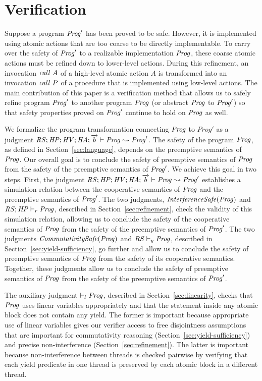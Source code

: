 \section{Verification}
\label{sec:verification}

Suppose a program $\mathit{Prog}'$ has been proved to be safe.
However, it is implemented using atomic actions that are too coarse to be directly implementable.  
To carry over the safety of $\mathit{Prog}'$ to a realizable implementation $\mathit{Prog}$, 
these coarse atomic actions must be refined down to lower-level actions.
During this refinement, an invocation $\mathit{call}\ A$ of a high-level atomic action $A$ is transformed into an 
invocation $\mathit{call}\ P$ of a procedure that is implemented using low-level actions.
The main contribution of this paper is a verification method that allows us to safely refine
program $\mathit{Prog}'$ to another program $\mathit{Prog}$ (or abstract $\mathit{Prog}$ to $\mathit{Prog}'$) so that 
safety properties proved on $\mathit{Prog}'$ continue to hold on $\mathit{Prog}$ as well.

We formalize the program transformation connecting $\mathit{Prog}$ to $Prog'$ as a judgment
$\mathit{RS};\mathit{HP};\mathit{HV};\mathit{HA};\overrightarrow{b} \vdash \mathit{Prog} \leadsto \mathit{Prog}'$.
The safety of the program $\mathit{Prog}$, as defined in Section~\ref{sec:language}, depends on 
the preemptive semantics of $\mathit{Prog}$.
Our overall goal is to conclude the safety of preemptive semantics of $\mathit{Prog}$
from the safety of the preemptive semantics of $\mathit{Prog}'$.
We achieve this goal in two steps.
First, the judgment $\mathit{RS};\mathit{HP};\mathit{HV};\mathit{HA};\overrightarrow{b} \vdash \mathit{Prog} \leadsto \mathit{Prog}'$
establishes a simulation relation between 
the cooperative semantics of $\mathit{Prog}$ and the preemptive semantics of $\mathit{Prog}'$.
The two judgments, $\mathit{InterferenceSafe}(\mathit{Prog})$ and $\mathit{RS};\mathit{HP} \vdash_r \mathit{Prog}$,
described in Section~\ref{sec:refinement}, check the validity of this simulation relation,
allowing us to conclude the safety of the cooperative semantics of $\mathit{Prog}$ from 
the safety of the preemptive semantics of $\mathit{Prog}'$.
The two judgments $\mathit{CommutativitySafe}(\mathit{Prog})$ and $\mathit{RS} \vdash_y \mathit{Prog}$,
described in Section~\ref{sec:yield-sufficiency}, go further 
and allow us to conclude the safety of preemptive semantics of $\mathit{Prog}$ from the 
safety of its cooperative semantics.
Together, these judgments allow us to conclude the safety of preemptive semantics of $\mathit{Prog}$
from the safety of the preemptive semantics of $\mathit{Prog}'$.

The auxiliary judgment $\vdash_l \mathit{Prog}$, described in Section~\ref{sec:linearity}, 
checks that $\mathit{Prog}$ uses linear variables appropriately and that the statement
inside any atomic block does not contain any yield.
The former is important because appropriate use of linear variables gives our verifier access to free disjointness
assumptions that are important for commutativity reasoning (Section~\ref{sec:yield-sufficiency})
and precise non-interference (Section~\ref{sec:refinement}).
The latter is important because non-interference between threads is checked pairwise by verifying that each yield predicate
in one thread is preserved by each atomic block in a different thread.

